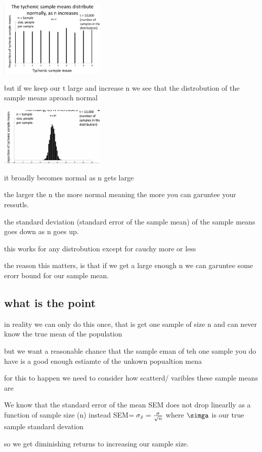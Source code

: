 \documentclass{article}
\begin{document}
\item  \includegraphics[width=5cm]{Final_Review/lecture_3/n=1.jpg} 
\item but if we keep our t large and increase n we see that the distrobution of the sample means aproach normal 
\item  \includegraphics[width=5cm]{Final_Review/lecture_3/n=81.jpg}
\item it broadly becomes normal as n gets large
\item the larger the n the more normal meaning the more you can garuntee your ressutls. 
\item the standard deviation (standard error of the sample mean) of the sample means goes down as n goes up.
\item this works for any distrobution except for cauchy more or less
\item the reason this matters, is that if we get a large enough n we can garuntee some erorr bound for our sample mean. 
\subsection{what is the point}
\item in reality we can only do this once, that is get one sample of size n and can never know the true mean of the population 
\item but we want a reasonable chance that the sample eman of teh one sample you do have is a good enough estiamte of the unkown popualtion mena 
\item for this to happen we need to consider how scatterd/ varibles these sample means are 
\item We know that the standard error of the mean SEM does not drop linearlly as a function of sample size (n) instead SEM$=\sigma_{\Bar{x}}=\frac{\sigma}{\sqrt{n}}$ where $\simga$ is our true sample standard devation 
\item so we get diminishing returns to increasing our sample size. 
\end{document}
